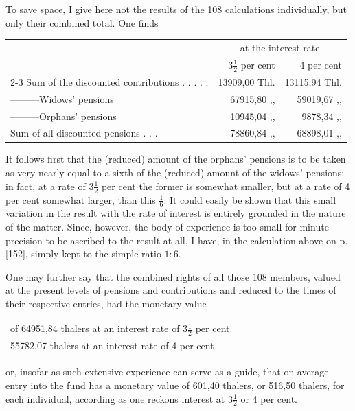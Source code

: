 To save space, I give here not the results of the 108 calculations individually, but only their combined total. One finds
\begin{center}
\footnotesize\setlength{\tabcolsep}{3pt}
\begin{tabular}{l r|r}
&\multicolumn{2}{c}{at the interest rate}\\
&\(3\tfrac{1}{2}\) per cent&4 per cent\\\cline{2-3}
Sum of the discounted contributions . . . . .&13909,00 Thl.&13115,94 Thl.\\
—\quad —\quad —\quad Widows' pensions&67915,80 ,, &59019,67 ,, \\
—\quad —\quad —\quad Orphans' pensions&10945,04 ,, &9878,34 ,, \\
Sum of all discounted pensions . . .&78860,84 ,, &68898,01 ,,
\end{tabular}
\end{center}
\noindent\hspace*{\parindent}It follows first that the (reduced) amount of the orphans' pensions is to be taken as very nearly equal to a sixth of the (reduced) amount of the widows' pensions: in fact, at a rate of \(3\tfrac{1}{2}\) per cent the former is somewhat smaller, but at a rate of 4 per cent somewhat larger, than this \(\tfrac{1}{6}\). It could easily be shown that this small variation in the result with the rate of interest is entirely grounded in the nature of the matter. Since, however, the body of experience is too small for minute precision to be ascribed to the result at all, I have, in the calculation above on p. [152], simply kept to the simple ratio \(1:6\).

One may further say that the combined rights of all those 108 members, valued at the present levels of pensions and contributions and reduced to the times of their respective entries, had the monetary value
\begin{center}
\begin{tabular}{l}
of 64951,84 thalers at an interest rate of \(3\tfrac{1}{2}\) per cent\\
\phantom{of }55782,07 thalers at an interest rate of 4 per cent
\end{tabular}
\end{center}
\noindent or, insofar as such extensive experience can serve as a guide, that on average entry into the fund has a monetary value of 601,40 thalers, or 516,50 thalers, for each individual, according as one reckons interest at \(3\tfrac{1}{2}\) or 4 per cent.

